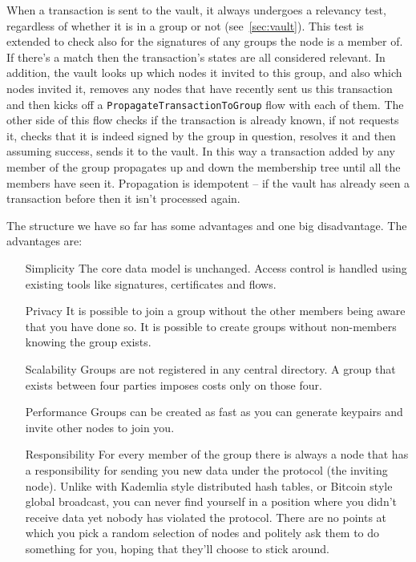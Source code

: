\documentclass{article}
\begin{document}
When a transaction is sent to the vault, it always undergoes a relevancy test, regardless of whether it is in a
group or not (see~\cref{sec:vault}). This test is extended to check also for the signatures of any groups the node
is a member of. If there's a match then the transaction's states are all considered relevant. In addition, the
vault looks up which nodes it invited to this group, and also which nodes invited it, removes any nodes that have
recently sent us this transaction and then kicks off a \texttt{PropagateTransactionToGroup} flow with each of them.
The other side of this flow checks if the transaction is already known, if not requests it, checks that it is
indeed signed by the group in question, resolves it and then assuming success, sends it to the vault. In this way a
transaction added by any member of the group propagates up and down the membership tree until all the members have
seen it. Propagation is idempotent -- if the vault has already seen a transaction before then it isn't processed
again.

The structure we have so far has some advantages and one big disadvantage. The advantages are:

\begin{itemize}
\item [Simplicity] The core data model is unchanged. Access control is handled using existing tools like signatures, certificates and flows.
\item [Privacy] It is possible to join a group without the other members being aware that you have done so. It is possible to create groups without non-members knowing the group exists.
\item [Scalability] Groups are not registered in any central directory. A group that exists between four parties imposes costs only on those four.
\item [Performance] Groups can be created as fast as you can generate keypairs and invite other nodes to join you.
\item [Responsibility] For every member of the group there is always a node that has a responsibility for sending you
new data under the protocol (the inviting node). Unlike with Kademlia style distributed hash tables, or Bitcoin style
global broadcast, you can never find yourself in a position where you didn't receive data yet nobody has violated the
protocol. There are no points at which you pick a random selection of nodes and politely ask them to do something for
you, hoping that they'll choose to stick around.
\end{itemize}
\end{document}
